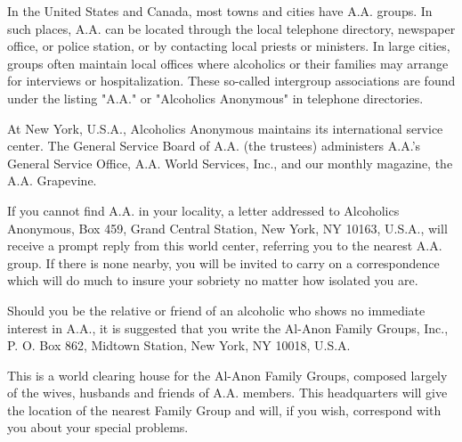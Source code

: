 

\bbChapterPreamble




\begin{biblechapter}
    In the United States and Canada, 
    most towns and cities have A.A. groups.
\verse In such places, 
    A.A. can be located through the local telephone directory, 
    newspaper office,
    or police station, 
    or by contacting local priests or ministers.
\verse In large cities, 
    groups often maintain local offices 
    where alcoholics or their families 
    may arrange for interviews or hospitalization.
\verse These so-called intergroup associations are found under the listing 
    "A.A." or "Alcoholics Anonymous" in telephone directories.

    At New York, U.S.A., 
    Alcoholics Anonymous maintains its international service center.
\verse The General Service Board of A.A. (the trustees) 
    administers A.A.'s General Service Office, A.A. World Services, Inc., 
    and our monthly magazine, the A.A. Grapevine.

\verse If you cannot find A.A. in your locality, 
    a letter addressed to Alcoholics Anonymous, 
    Box 459, Grand Central Station, New York, NY 10163, U.S.A., 
    will receive a prompt reply from this world center, 
    referring you to the nearest A.A. group.
\verse If there is none nearby, 
    you will be invited to carry on a correspondence 
    which will do much to insure your sobriety 
    no matter how isolated you are.

    Should you be the relative or friend of an alcoholic 
    who shows no immediate interest in A.A., 
    it is suggested that you write the Al-Anon Family Groups, Inc., 
    P. O. Box 862, Midtown Station, New York, NY 10018, U.S.A.

\verse This is a world clearing house for the Al-Anon Family Groups, 
    composed largely of the wives, husbands and friends of A.A. members.
\verse This headquarters will give the location of the nearest Family Group 
    and will, if you wish, correspond with you about your special problems.
\end{biblechapter}
